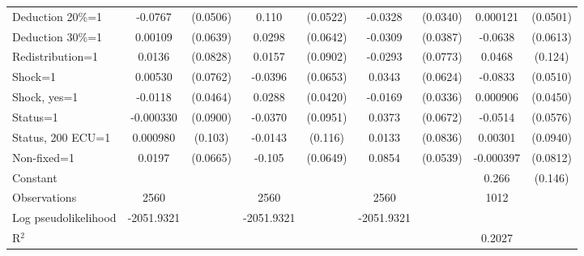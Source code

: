\begin{tabular}{l|cccccc|cc}
Deduction 20\%=1&  -0.0767         & (0.0506)&    0.110\sym{**} & (0.0522)&  -0.0328         & (0.0340)& 0.000121         & (0.0501)\\
Deduction 30\%=1&  0.00109         & (0.0639)&   0.0298         & (0.0642)&  -0.0309         & (0.0387)&  -0.0638         & (0.0613)\\
Redistribution=1&   0.0136         & (0.0828)&   0.0157         & (0.0902)&  -0.0293         & (0.0773)&   0.0468         &  (0.124)\\
Shock=1         &  0.00530         & (0.0762)&  -0.0396         & (0.0653)&   0.0343         & (0.0624)&  -0.0833         & (0.0510)\\
Shock, yes=1    &  -0.0118         & (0.0464)&   0.0288         & (0.0420)&  -0.0169         & (0.0336)& 0.000906         & (0.0450)\\
Status=1        &-0.000330         & (0.0900)&  -0.0370         & (0.0951)&   0.0373         & (0.0672)&  -0.0514         & (0.0576)\\
Status, 200 ECU=1& 0.000980         &  (0.103)&  -0.0143         &  (0.116)&   0.0133         & (0.0836)&  0.00301         & (0.0940)\\
Non-fixed=1     &   0.0197         & (0.0665)&   -0.105         & (0.0649)&   0.0854         & (0.0539)&-0.000397         & (0.0812)\\
Constant        &                  &         &                  &         &                  &         &    0.266\sym{*}  &  (0.146)\\
\hline
Observations    &     2560         &         &     2560         &         &     2560         &         &     1012         &         \\
Log pseudolikelihood  & -2051.9321   &         &           -2051.9321       &         &         -2051.9321         &         &           &   \\ 
R$^2$      &                  &         &                  &         &                  &         &     0.2027      &   \\ 


\end{tabular}
